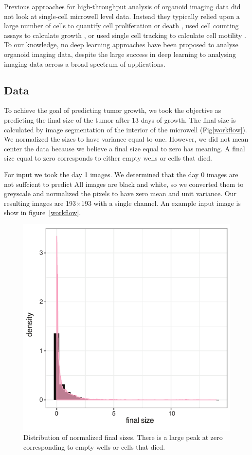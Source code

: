 \documentclass[10pt,twocolumn,letterpaper]{article}
\begin{document}
Previous approaches for high-throughput analysis of organoid imaging data did not look at single-cell microwell level data.  Instead they typically relied upon a large number of cells to quantify cell proliferation or death \cite{jabs2017screening},  used cell counting assays to calculate growth \cite{sebrell2018live}, or used single cell tracking to calculate cell motility \cite{geum2016epidermal}.  To our knowledge, no deep learning approaches have been proposed to analyse organoid imaging data, despite the large success in deep learning to analysing imaging data across a broad spectrum of applications.

\subsection*{Data}

To achieve the goal of predicting tumor growth, we took the objective as predicting the final size of the tumor after 13 days of growth.  The final size is calculated by image segmentation of the interior of the microwell (Fig\ref{workflow}).  We normalized the sizes to have variance equal to one.  However, we did not mean center the data because we believe a final size equal to zero has meaning.  A final size equal to zero corresponds to either empty wells or cells that died.  

For input we took the day 1 images.  We determined that the day 0 images are not suffcient to predict  All images are black and white, so we converted them to greyscale and normalized the pixels to have zero mean and unit variance.  Our resulting images are 193$\times$193 with a single channel.   An example input image is show in figure~\ref{workflow}.

\begin{figure}[b!]
\begin{center}
 \includegraphics[width=0.8\linewidth]{figures/final_day_hyst2_area_density.pdf}
\end{center}
   \caption{Distribution of normalized final sizes.  There is a large peak at zero corresponding to empty wells or cells that died.}
\label{final_size_dist}
\end{figure}
\end{document}
